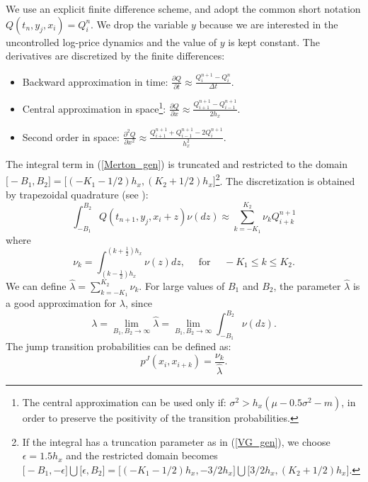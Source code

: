 We use an explicit finite difference scheme, and adopt the common short notation
$ Q(t_n,y_j,x_i) = Q^n_{i} $. We drop the variable $y$ because we are interested in the uncontrolled log-price dynamics and the value of $y$ is kept constant.
The derivatives are discretized by the finite differences:
\begin{itemize}
 \item Backward approximation in time: 
 $ \frac{\partial Q}{\partial t} \approx \frac{Q^{n+1}_{i} - Q^{n}_{i}}{\Delta t} $.
 \item Central approximation in space\footnote{The central approximation can be used only if: $\sigma^2 > h_x (\mu -0.5\sigma^2 -m)$, 
 in order to preserve the positivity of the transition probabilities.}: 
 $ \frac{\partial Q}{\partial x} \approx \frac{Q^{n+1}_{i+1} - Q^{n+1}_{i-1}}{2 h_x} $.
 \item Second order in space:   
 $ \frac{\partial^2 Q}{\partial x^2} \approx \frac{Q^{n+1}_{i+1} + Q^{n+1}_{i-1} -2 Q^{n+1}_{i}}{h_x^2} $.
\end{itemize}
The integral term in (\ref{Merton_gen}) is truncated and restricted to the domain 
$ \bigl[-B_1,B_2\bigr] = \bigl[ ( -K_1-1/2 )h_x , ( K_2+1/2 )h_x \bigr] $\footnote{If the integral has a truncation parameter as in (\ref{VG_gen}), 
we choose $\epsilon = 1.5h_x$ and the 
restricted domain becomes $ \bigl[-B_1,-\epsilon \bigr]\bigcup \bigl[\epsilon,B_2 \bigr] = \bigl[ ( -K_1-1/2 )h_x , -3/2 h_x \bigr] \bigcup \bigl[ 3/2 h_x, ( K_2+1/2 )h_x \bigr] $. }.
The discretization is obtained by trapezoidal quadrature (see \cite{Cont}):
\begin{equation}\label{trap_quad}
 \int_{-B_1}^{B_2}  Q(t_{n+1},y_j,x_i +z) \nu(dz) \approx \sum_{k = -K_1}^{K_2} \nu_k Q^{n+1}_{i+k}
\end{equation}
where
\begin{equation}\label{nu1}
 \nu_k = \int_{(k-\frac{1}{2}) h_x}^{(k+\frac{1}{2}) h_x} \nu(z) dz, \hspace{1em} \mbox{ for } \hspace{1em} -K_1 \leq k \leq K_2. 
\end{equation}
We can define $ \hat \lambda = \sum_{k = -K_1}^{K_2} \nu_k $. For large values of $B_1$ and $B_2$, the parameter $\hat \lambda$ is a good approximation for $\lambda$, since
$$\lambda = \lim_{B_1,B_2 \to \infty} \hat \lambda = \lim_{B_1,B_2 \to \infty} \int_{-B_1}^{B_2} \nu(dz).$$
The jump transition probabilities can be defined as:
\begin{equation}\label{p^J}
 p^J(x_i,x_{i+k}) = \frac{\nu_k}{\hat \lambda}. 
\end{equation}
